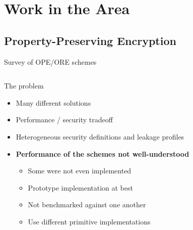 \section{Work in the Area}

	\subsection{Property-Preserving Encryption}

		\begin{frame}{Survey of OPE/ORE schemes~\cite{ore-benchmark-17}}

			\begin{columns}[T,onlytextwidth]

					\begin{block}{The problem}

						\begin{itemize}
							\item Many different solutions
							\item Performance / security tradeoff
							\item Heterogeneous security definitions and leakage profiles
							\item \textbf{Performance of the schemes not well-understood}
							\begin{itemize}
								\item Some were not even implemented
								\item Prototype implementation at best
								\item Not benchmarked against one another
								\item Use different primitive implementations
							\end{itemize}
						\end{itemize}

					\end{block}


\end{columns}
\end{frame}

